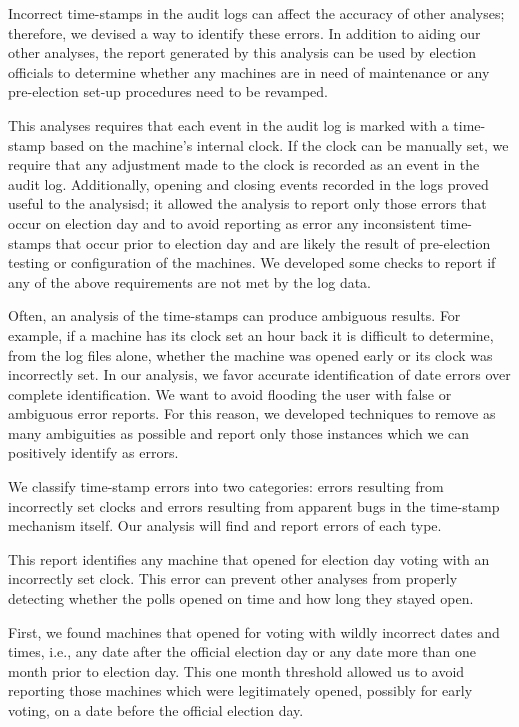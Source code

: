 \label{an:date} 
\smvertspace
Incorrect time-stamps in the audit logs can affect the accuracy of other
analyses; therefore, we devised a way to identify these errors.
In addition to aiding our other analyses, the report generated by this analysis
can be used by election officials to determine whether any machines 
are in need of maintenance or any pre-election set-up procedures need to be
revamped.

This analyses requires that each event in the audit log
is marked with a time-stamp based on the machine's internal clock. If
the clock can be manually set, we require that any adjustment made to
the clock is recorded as an event in the
audit log. Additionally, opening and closing events recorded in the logs proved
useful to the analysisd; it allowed the analysis to report only those
errors that occur on election day and to avoid reporting as error
any inconsistent time-stamps that occur prior to election day and are
likely the result of pre-election testing or configuration of the
machines. We developed some checks to report if any of
the above requirements are not met by the log data.

Often, an analysis of the time-stamps can produce ambiguous
results. For example, if a machine has its clock set an hour back it
is difficult to determine, from the log files alone, whether the machine
was opened early or its clock was incorrectly set. In our analysis, we
favor accurate identification of date errors over complete
identification. We want to avoid flooding the user with false or
ambiguous error reports. For this reason, we developed techniques to
remove as many ambiguities as possible and report only those
instances which we can positively identify as errors.

We classify time-stamp errors into two categories: errors
resulting from incorrectly set clocks and errors resulting from apparent bugs in
the time-stamp mechanism itself. Our analysis will
find and report errors of each type.

This report identifies any machine that opened for election day voting
with an incorrectly set clock. This error can prevent other analyses
from properly detecting whether the polls opened on time and how long they
stayed open.

First, we found machines that opened for voting with wildly incorrect
dates and times, i.e., any date after the official election
day or any date more than one month prior to election day. This one
month threshold allowed us to avoid reporting those machines which
were legitimately opened, possibly for early voting, on a date before
the official election day. 

